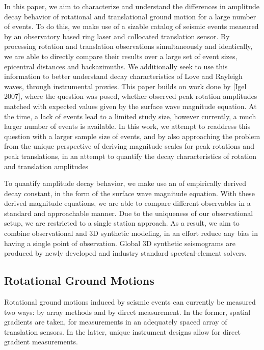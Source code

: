 \documentclass{gji}
\begin{document}
In this paper, we aim to characterize and understand the differences in amplitude decay behavior of rotational and translational ground motion for a large number of events. To do this, we make use of a sizable catalog of seismic events measured by an observatory based ring laser and collocated translation sensor. By processing rotation and translation observations simultaneously and identically, we are able to directly compare their results over a large set of event sizes, epicentral distances and backazimuths. We additionally seek to use this information to better understand decay characteristics of Love and Rayleigh waves, through instrumental proxies. 
This paper builds on work done by [Igel 2007], %
where the question was posed, whether observed peak rotation amplitudes matched with expected values given by the surface wave magnitude equation. At the time, a lack of events lead to a limited study size, however currently, a much larger number of events is available. In this work, we attempt to readdress this question with a larger sample size of events, and by also approaching the problem from the unique perspective of deriving magnitude scales for peak rotations and peak translations, in an attempt to quantify the decay characteristics of rotation and translation amplitudes

To quantify amplitude decay behavior, we make use an of empirically derived decay constant, in the form of the surface wave magnitude equation. %
With these derived magnitude equations, we are able to compare different observables in a standard and approachable manner. Due to the uniqueness of our observational setup, we are restricted to a single station approach. As a result, we aim to combine observational and 3D synthetic modeling, in an effort reduce any bias in having a single point of observation. Global 3D synthetic seismograms are produced by newly developed and industry standard spectral-element solvers.



\subsection{Rotational Ground Motions}
Rotational ground motions induced by seismic events can currently be measured two ways: by array methods and by direct measurement. %
In the former, spatial gradients are taken, for measurements in an adequately spaced array of translation sensors. In the latter, unique instrument designs allow for direct gradient measurements. %
\end{document}
